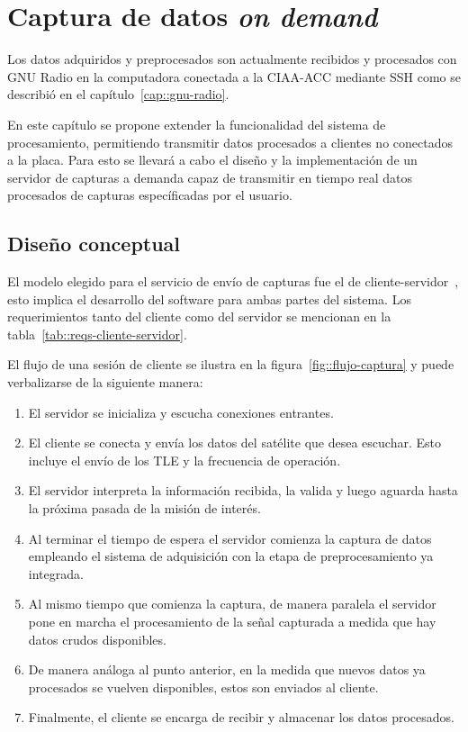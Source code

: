 \documentclass[../../main.tex]{subfiles}
\begin{document}
\graphicspath{{./figures}}
\chapter{Captura de datos \textit{on demand}}
Los datos adquiridos y preprocesados son actualmente recibidos y procesados con GNU Radio en la computadora conectada a la CIAA-ACC mediante SSH como se describió en el capítulo~\ref{cap::gnu-radio}.

En este capítulo se propone extender la funcionalidad del sistema de procesamiento, permitiendo transmitir datos procesados a clientes no conectados a la placa. Para esto se llevará a cabo el diseño y la implementación de un servidor de capturas a demanda capaz de transmitir en tiempo real datos procesados de capturas específicadas por el usuario.

\section{Diseño conceptual}
El modelo elegido para el servicio de envío de capturas fue el de cliente-servidor~\cite{client-server-model}, esto implica el desarrollo del software para ambas partes del sistema. Los requerimientos tanto del cliente como del servidor se mencionan en la tabla~\ref{tab::reqs-cliente-servidor}.

El flujo de una sesión de cliente se ilustra en la figura~\ref{fig::flujo-captura} y puede verbalizarse de la siguiente manera:
\begin{enumerate}
    \item El servidor se inicializa y escucha conexiones entrantes.
    \item El cliente se conecta y envía los datos del satélite que desea escuchar. Esto incluye el envío de los TLE y la frecuencia de operación.
    \item El servidor interpreta la información recibida, la valida y luego aguarda hasta la próxima pasada de la misión de interés.
    \item Al terminar el tiempo de espera el servidor comienza la captura de datos empleando el sistema de adquisición con la etapa de preprocesamiento ya integrada.
    \item Al mismo tiempo que comienza la captura, de manera paralela el servidor pone en marcha el procesamiento de la señal capturada a medida que hay datos crudos disponibles.
    \item De manera análoga al punto anterior, en la medida que nuevos datos ya procesados se vuelven disponibles, estos son enviados al cliente.
    \item Finalmente, el cliente se encarga de recibir y almacenar los datos procesados.
\end{enumerate}
\end{document}
